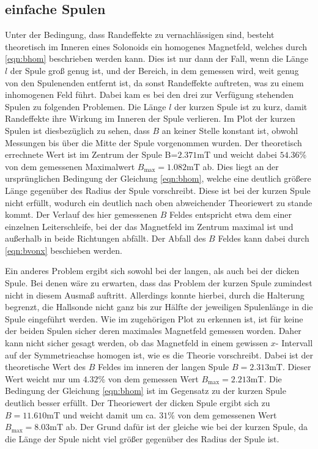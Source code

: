     \subsection{einfache Spulen}
        Unter der Bedingung, dass Randeffekte zu vernachlässigen sind, besteht theoretisch im Inneren eines Solonoids ein
        homogenes Magnetfeld, welches durch \eqref{eqn:bhom} beschrieben werden kann. Dies ist nur dann der Fall, wenn die Länge $l$
        der Spule groß genug ist, und der Bereich, in dem gemessen wird, weit genug von den Spulenenden entfernt ist, da sonst
        Randeffekte auftreten, was zu einem inhomogenen Feld führt. Dabei kam es bei den drei zur Verfügung stehenden Spulen zu
        folgenden Problemen. Die Länge $l$ der kurzen Spule ist zu kurz, damit Randeffekte ihre Wirkung im Inneren der Spule verlieren.
        Im Plot der kurzen Spulen ist diesbezüglich zu sehen, dass $B$ an keiner Stelle konstant ist, obwohl Messungen bis über die
        Mitte der Spule vorgenommen wurden. Der theoretisch errechnete Wert ist im Zentrum der Spule B=$2.371\si{\milli\tesla}$ und weicht dabei 
        $54.36$\% von dem gemessenen Maximalwert $B_{\text{max}}=1.082\si{\milli\tesla}$ ab. Dies liegt an der ursprünglichen
        Bedingung der Gleichung \eqref{eqn:bhom}, welche eine deutlich größere Länge gegenüber des Radius der Spule vorschreibt. 
        Diese ist bei der kurzen Spule nicht erfüllt, wodurch ein deutlich nach oben abweichender Theoriewert zu stande kommt. Der Verlauf des hier gemessenen $B$ Feldes entspricht etwa dem einer einzelnen Leiterschleife,
        bei der das Magnetfeld im Zentrum maximal ist und außerhalb in beide Richtungen abfällt. Der Abfall des $B$ Feldes kann dabei
        durch \eqref{eqn:bvonx} beschieben werden. 

        Ein anderes Problem ergibt sich sowohl bei der langen, als auch bei der dicken Spule. Bei denen wäre zu erwarten, dass 
        das Problem der kurzen Spule zumindest nicht in diesem Ausmaß auftritt. Allerdings konnte hierbei, durch die Halterung begrenzt,
        die Hallsonde nicht ganz bis zur Hälfte der jeweiligen Spulenlänge in die Spule eingeführt werden. Wie im zugehörigen Plot
        zu erkennen ist, ist für keine der beiden Spulen sicher deren maximales Magnetfeld gemessen worden. Daher kann nicht sicher 
        gesagt werden, ob das Magnetfeld in einem gewissen $x$- Intervall auf der Symmetrieachse homogen ist, wie es die Theorie vorschreibt.
        Dabei ist der theoretische Wert des $B$ Feldes im inneren der langen Spule $B=2.313\si{\milli\tesla}$. Dieser Wert weicht nur um $4.32$\%
        von dem gemessen Wert $B_{\text{max}}=2.213\si{\milli\tesla}$. Die Bedingung der Gleichung \eqref{eqn:bhom} ist im Gegensatz zu der kurzen Spule deutlich 
        besser erfüllt. Der Theoriewert der dicken Spule ergibt sich zu $B=11.610\si{\milli\tesla}$ und weicht damit um ca. $31$\% von dem gemessenen Wert 
        $B_{\text{max}}=8.03\si{\milli\tesla}$ ab. Der Grund dafür ist der gleiche wie bei der kurzen Spule, da die Länge der Spule nicht viel größer gegenüber des Radius der Spule ist.

